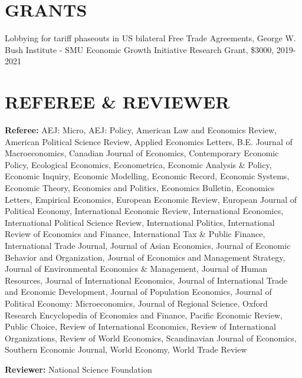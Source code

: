 \documentclass[11pt]{res}
\begin{document}
\begin{resume}
\section{GRANTS}\vspace{1.5mm}
Lobbying for tariff phaseouts in US bilateral Free Trade Agreements, George W. Bush Institute - SMU Economic Growth Initiative Research Grant, \$3000, 2019-2021

\section{REFEREE \& REVIEWER} \vspace{1.5mm}
{\bf Referee:} AEJ: Micro, AEJ: Policy, American Law and Economics Review, American Political Science Review, Applied Economics Letters, B.E. Journal of Macroeconomics, Canadian Journal of Economics, Contemporary Economic Policy, Ecological Economics, Econometrica, Economic Analysis \& Policy, Economic Inquiry, Economic Modelling, Economic Record, Economic Systems, Economic Theory, Economics and Politics, Economics Bulletin, Economics Letters, Empirical Economics, European Economic Review, European Journal of Political Economy, International Economic Review, International Economics, International Political Science Review, International Politics, International Review of Economics and Finance, International Tax \& Public Finance, International Trade Journal, Journal of Asian Economics, Journal of Economic Behavior and Organization, Journal of Economics and Management Strategy, Journal of Environmental Economics \& Management, Journal of Human Resources, Journal of International Economics, Journal of International Trade and Economic Development, Journal of Population Economics, Journal of Political Economy: Microeconomics, Journal of Regional Science, Oxford Research Encyclopedia of Economics and Finance, Pacific Economic Review, Public Choice, Review of International Economics, Review of International Organizations, Review of World Economics, Scandinavian Journal of Economics, Southern Economic Journal, World Economy, World Trade Review

{\bf Reviewer:} National Science Foundation


\end{resume}
\end{document}
